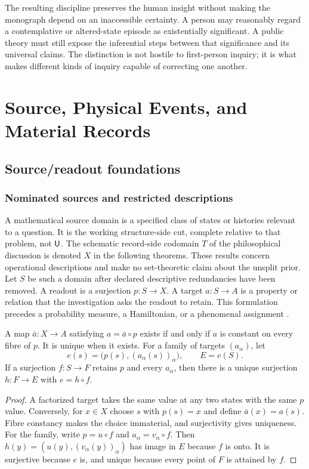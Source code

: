 The resulting discipline preserves the human insight without making the monograph depend on an inaccessible certainty. A person may reasonably regard a contemplative or altered-state episode as existentially significant. A public theory must still expose the inferential steps between that significance and its universal claims. The distinction is not hostile to first-person inquiry; it is what makes different kinds of inquiry capable of correcting one another.


\part{Source, Physical Events, and Material Records}\label{part:physics}
\chapter{Source/readout foundations}\label{ch:source}
\section{Nominated sources and restricted descriptions}\label{section:source:nominated-sources-and-restricted-descriptions}
A mathematical source domain is a specified class of states or histories relevant to a question. It is the working structure-side cut, complete relative to that problem, not $\mathsf{U}$. The schematic record-side codomain $T$ of the philosophical discussion is denoted $X$ in the following theorems. These results concern operational descriptions and make no set-theoretic claim about the unsplit prior. Let $S$ be such a domain after declared descriptive redundancies have been removed. A readout is a surjection $p:S\to X$. A target $a:S\to A$ is a property or relation that the investigation asks the readout to retain. This formulation precedes a probability measure, a Hamiltonian, or a phenomenal assignment \cite{RodgersSource,RodgersMeasurement}.

\begin{theorem}\label{thm:descent}
A map $\bar a:X\to A$ satisfying $a=\bar a\circ p$ exists if and only if $a$ is constant on every fibre of $p$. It is unique when it exists. For a family of targets $(a_\alpha)$, let
\[
e(s)=\bigl(p(s),(a_\alpha(s))_\alpha\bigr),\qquad E=e(S).
\]
If a surjection $f:S\to F$ retains $p$ and every $a_\alpha$, then there is a unique surjection $h:F\to E$ with $e=h\circ f$.
\end{theorem}
\begin{proof}
A factorized target takes the same value at any two states with the same $p$ value. Conversely, for $x\in X$ choose $s$ with $p(s)=x$ and define $\bar a(x)=a(s)$. Fibre constancy makes the choice immaterial, and surjectivity gives uniqueness. For the family, write $p=u\circ f$ and $a_\alpha=v_\alpha\circ f$. Then $h(y)=(u(y),(v_\alpha(y))_\alpha)$ has image in $E$ because $f$ is onto. It is surjective because $e$ is, and unique because every point of $F$ is attained by $f$.
\end{proof}

